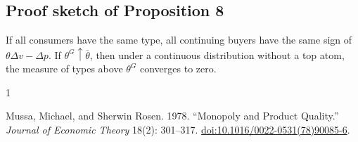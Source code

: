 \documentclass[12pt]{article}
\theoremstyle{plain}
\theoremstyle{definition}
\theoremstyle{remark}
\begin{document}
\subsection*{Proof sketch of Proposition 8}
If all consumers have the same type, all continuing buyers have the same sign of $\theta\Delta v-\Delta p$. If $\theta^G\uparrow\overline\theta$, then under a continuous distribution without a top atom, the measure of types above $\theta^G$ converges to zero.

\begin{thebibliography}{1}

Mussa, Michael, and Sherwin Rosen. 1978. ``Monopoly and Product Quality.'' \emph{Journal of Economic Theory} 18(2): 301--317. \href{https://doi.org/10.1016/0022-0531(78)90085-6}{doi:10.1016/0022-0531(78)90085-6}.

\end{thebibliography}
\end{document}

